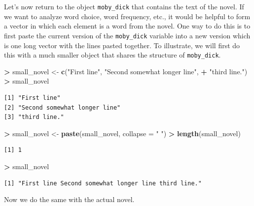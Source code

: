 \documentclass[]{krantz}
\makeatletter
\newenvironment{Shaded}{\begin{snugshade}}{\end{snugshade}}
\newcommand{\DataTypeTok}[1]{\textcolor[rgb]{0.27,0.27,0.27}{#1}}
\newcommand{\KeywordTok}[1]{\textcolor[rgb]{0.27,0.27,0.27}{\textbf{#1}}}
\newcommand{\NormalTok}[1]{#1}
\newcommand{\OperatorTok}[1]{\textcolor[rgb]{0.43,0.43,0.43}{\textbf{#1}}}
\newcommand{\StringTok}[1]{\textcolor[rgb]{0.5,0.5,0.5}{#1}}
\newenvironment{kframe}{%
\medskip{}
\setlength{\fboxsep}{.8em}
 \def\at@end@of@kframe{}%
 \ifinner\ifhmode%
  \def\at@end@of@kframe{\end{minipage}}%
  \begin{minipage}{\columnwidth}%
 \fi\fi%
 \def\FrameCommand##1{\hskip\@totalleftmargin \hskip-\fboxsep
 \colorbox{shadecolor}{##1}\hskip-\fboxsep
     \hskip-\linewidth \hskip-\@totalleftmargin \hskip\columnwidth}%
 \MakeFramed {\advance\hsize-\width
   \@totalleftmargin\z@ \linewidth\hsize
   \@setminipage}}%
 {\par\unskip\endMakeFramed%
 \at@end@of@kframe}
\renewenvironment{Shaded}{\begin{kframe}}{\end{kframe}}
\makeatother
\begin{document}
Let's now return to the object \texttt{moby\_dick} that contains the text of the novel. If we want to analyze word choice, word frequency, etc., it would be helpful to form a vector in which each element is a word from the novel. One way to do this is to first paste the current version of the \texttt{moby\_dick} variable into a new version which is one long vector with the lines pasted together. To illustrate, we will first do this with a much smaller object that shares the structure of \texttt{moby\_dick}.

\begin{Shaded}
\begin{Highlighting}[]
\OperatorTok{>}\StringTok{ }\NormalTok{small_novel <-}\StringTok{ }\KeywordTok{c}\NormalTok{(}\StringTok{"First line"}\NormalTok{, }\StringTok{"Second somewhat longer line"}\NormalTok{, }
\OperatorTok{+}\StringTok{   "third line."}\NormalTok{)}
\OperatorTok{>}\StringTok{ }\NormalTok{small_novel}
\end{Highlighting}
\end{Shaded}

\begin{verbatim}
[1] "First line"                 
[2] "Second somewhat longer line"
[3] "third line."                
\end{verbatim}

\begin{Shaded}
\begin{Highlighting}[]
\OperatorTok{>}\StringTok{ }\NormalTok{small_novel <-}\StringTok{ }\KeywordTok{paste}\NormalTok{(small_novel, }\DataTypeTok{collapse =} \StringTok{" "}\NormalTok{)}
\OperatorTok{>}\StringTok{ }\KeywordTok{length}\NormalTok{(small_novel)}
\end{Highlighting}
\end{Shaded}

\begin{verbatim}
[1] 1
\end{verbatim}

\begin{Shaded}
\begin{Highlighting}[]
\OperatorTok{>}\StringTok{ }\NormalTok{small_novel}
\end{Highlighting}
\end{Shaded}

\begin{verbatim}
[1] "First line Second somewhat longer line third line."
\end{verbatim}

Now we do the same with the actual novel.
\end{document}
